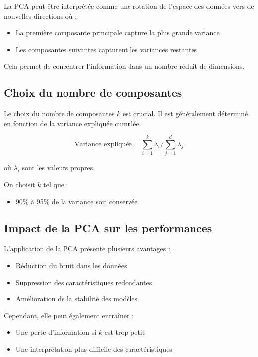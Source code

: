 \documentclass[12pt,a4paper]{article}
\begin{document}
        La PCA peut être interprétée comme une rotation de l’espace des données vers de nouvelles directions où :
        \begin{itemize}
            \item La première composante principale capture la plus grande variance
            \item Les composantes suivantes capturent les variances restantes
        \end{itemize}

        Cela permet de concentrer l’information dans un nombre réduit de dimensions.

    \subsection{Choix du nombre de composantes}

        Le choix du nombre de composantes \(k\) est crucial.
        Il est généralement déterminé en fonction de la variance expliquée cumulée.

        \[
        \text{Variance expliquée} = \sum_{i=1}^{k} \lambda_i \Big/ \sum_{j=1}^{d} \lambda_j
        \]

        où \(\lambda_i\) sont les valeurs propres.

        On choisit \(k\) tel que :
        \begin{itemize}
            \item 90\% à 95\% de la variance soit conservée
        \end{itemize}

    \subsection{Impact de la PCA sur les performances}

        L’application de la PCA présente plusieurs avantages :
        \begin{itemize}
            \item Réduction du bruit dans les données
            \item Suppression des caractéristiques redondantes
            \item Amélioration de la stabilité des modèles
        \end{itemize}

        Cependant, elle peut également entraîner :
        \begin{itemize}
            \item Une perte d’information si \(k\) est trop petit
            \item Une interprétation plus difficile des caractéristiques
        \end{itemize}
\end{document}
